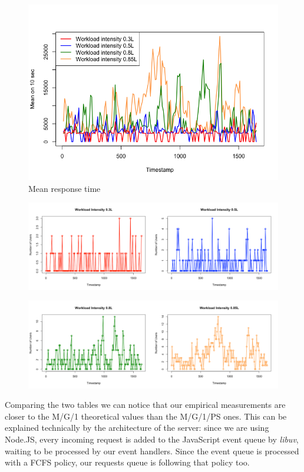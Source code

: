 \documentclass[11pt]{scrartcl} %
\begin{document}
\begin{figure}[H]
\centering
\includegraphics[width=15cm]{Images/respTimes.png}
\caption{Mean response time}
\end{figure}

\begin{figure}[H]
\centering
\includegraphics[width=15cm]{Images/user35side.png}
\end{figure}

\begin{figure}[H]
\centering
\includegraphics[width=15cm]{Images/user858side.png}
\end{figure}


Comparing the two tables we can notice that our empirical measurements are closer to the M/G/1 theoretical values than the M/G/1/PS ones. This can be explained technically by the architecture of the server: since we are using Node.JS, every incoming request is added to the JavaScript event queue by \textit{libuv}, waiting to be processed by our event handlers. Since the event queue is processed with a FCFS policy, our requests queue is following that policy too.
\end{document}
